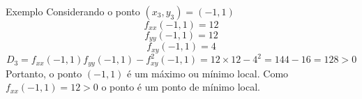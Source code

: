 \begin{frame}{Exemplo \theexemplo}
  Considerando o ponto \((x_3, y_3) = (-1, 1)\)
  \[
  f_{xx}(-1, 1) = 12
  \]
  \[
  f_{yy}(-1, 1) = 12
  \]
  \[
  f_{xy}(-1, 1) = 4
  \]
  \[
  D_3
  = f_{xx}(-1, 1)f_{yy}(-1, 1) - f^2_{xy}(-1, 1)
  = 12 \times 12 - 4^2
  = 144 -16
  = 128 > 0
  \]
  Portanto, o ponto $(-1, 1)$ é um máximo ou mínimo local. Como \(f_{xx}(-1, 1) = 12 > 0\)
  o ponto é um ponto de mínimo local.
\end{frame}

